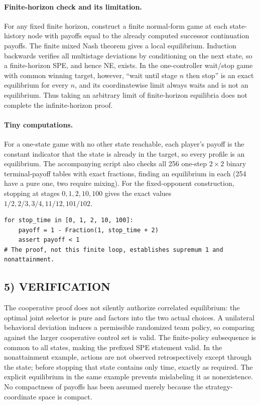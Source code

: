 \documentclass[11pt,a4paper]{article}
\theoremstyle{definition}
\theoremstyle{remark}
\begin{document}
\paragraph{Finite-horizon check and its limitation.}
For any fixed finite horizon, construct a finite normal-form game at each state-history node with payoffs equal to the already computed successor continuation payoffs. The finite mixed Nash theorem \cite{nash} gives a local equilibrium. Induction backwards verifies all multistage deviations by conditioning on the next state, so a finite-horizon SPE, and hence NE, exists. In the one-controller wait/stop game with common winning target, however, ``wait until stage $n$ then stop'' is an exact equilibrium for every $n$, and its coordinatewise limit always waits and is not an equilibrium. Thus taking an arbitrary limit of finite-horizon equilibria does not complete the infinite-horizon proof.

\paragraph{Tiny computations.}
For a one-state game with no other state reachable, each player's payoff is the constant indicator that the state is already in the target, so every profile is an equilibrium. The accompanying script also checks all 256 one-step $2\times2$ binary terminal-payoff tables with exact fractions, finding an equilibrium in each (254 have a pure one, two require mixing). For the fixed-opponent construction, stopping at stages $0,1,2,10,100$ gives the exact values $1/2,2/3,3/4,11/12,101/102$.
\begin{lstlisting}
for stop_time in [0, 1, 2, 10, 100]:
    payoff = 1 - Fraction(1, stop_time + 2)
    assert payoff < 1
# The proof, not this finite loop, establishes supremum 1 and nonattainment.
\end{lstlisting}

\subsection*{5) VERIFICATION}
The cooperative proof does not silently authorize correlated equilibrium: the optimal joint selector is pure and factors into the two actual choices. A unilateral behavioral deviation induces a permissible randomized team policy, so comparing against the larger cooperative control set is valid. The finite-policy subsequence is common to all states, making the prefixed SPE statement valid. In the nonattainment example, actions are not observed retrospectively except through the state; before stopping that state contains only time, exactly as required. The explicit equilibrium in the same example prevents mislabeling it as nonexistence. No compactness of payoffs has been assumed merely because the strategy-coordinate space is compact.
\end{document}
